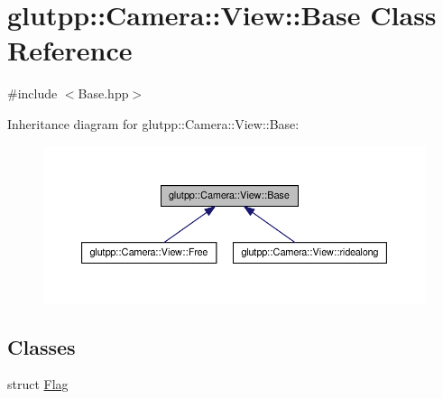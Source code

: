 \hypertarget{classglutpp_1_1Camera_1_1View_1_1Base}{\section{glutpp\-:\-:\-Camera\-:\-:\-View\-:\-:\-Base \-Class \-Reference}
\label{classglutpp_1_1Camera_1_1View_1_1Base}
}


 




{\ttfamily \#include $<$\-Base.\-hpp$>$}



\-Inheritance diagram for glutpp\-:\-:\-Camera\-:\-:\-View\-:\-:\-Base\-:
\nopagebreak
\begin{figure}[H]
\begin{center}
\leavevmode
\includegraphics[width=350pt]{classglutpp_1_1Camera_1_1View_1_1Base__inherit__graph}
\end{center}
\end{figure}
\subsection*{\-Classes}
\begin{DoxyCompactItemize}
\item 
struct \hyperlink{structglutpp_1_1Camera_1_1View_1_1Base_1_1Flag}{\-Flag}
\end{DoxyCompactItemize}
